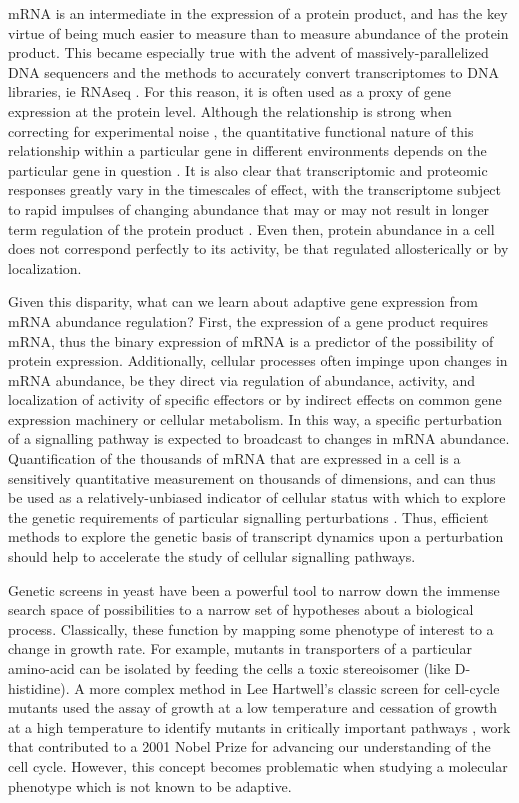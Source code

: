 mRNA is an intermediate in the expression of a protein product, and
has the key virtue of being much easier to measure than to measure
abundance of the protein product. This became especially true with the
advent of massively-parallelized DNA sequencers and the methods to
accurately convert transcriptomes to DNA libraries, ie RNAseq
\parencite{shendure2017dna}. For this reason, it is often used as a proxy
of gene expression at the protein level. Although the relationship is
strong when correcting for experimental noise 
\parencite{csardi2015accounting},
the quantitative functional nature of this relationship within a
particular gene in different environments depends on the particular
gene in question 
\parencite{franks2017post}. It is also clear that
transcriptomic and proteomic responses greatly vary in the timescales
of effect, with the transcriptome subject to rapid impulses of
changing abundance that may or may not result in longer term
regulation of the protein product 
\parencite{cheng2016differential,lee2011dynamic}. 
Even then, protein abundance in a cell does not correspond
perfectly to its activity, be that regulated allosterically or by
localization.  

Given this disparity, what can we learn about adaptive
gene expression from mRNA abundance regulation? First, the expression
of a gene product requires mRNA, thus the binary expression of mRNA is
a predictor of the possibility of protein expression. Additionally,
cellular processes often impinge upon changes in mRNA abundance, be
they direct via regulation of abundance, activity, and localization of
activity of specific effectors or by indirect effects on common gene
expression machinery or cellular metabolism. In this way, a specific
perturbation of a signalling pathway is expected to broadcast to
changes in mRNA abundance. Quantification of the thousands of mRNA
that are expressed in a cell is a sensitively quantitative measurement
on thousands of dimensions, and can thus be used as a
relatively-unbiased indicator of cellular status with which to explore
the genetic requirements of particular signalling perturbations 
\parencite{gapp2016parallel}. Thus, efficient methods to explore the genetic
basis of transcript dynamics upon a perturbation should help to
accelerate the study of cellular signalling pathways.  

Genetic screens
in yeast have been a powerful tool to narrow down the immense search
space of possibilities to a narrow set of hypotheses about a
biological process. Classically, these function by mapping some
phenotype of interest to a change in growth rate. For example, mutants
in transporters of a particular amino-acid can be isolated by feeding
the cells a toxic stereoisomer (like D-histidine). A more complex
method in Lee Hartwell’s classic screen for cell-cycle mutants used
the assay of growth at a low temperature and cessation of growth at a
high temperature to identify mutants in critically important pathways
\parencite{hartwell1970genetic}, work that contributed to a 2001 Nobel Prize for
advancing our understanding of the cell cycle. However, this concept
becomes problematic when studying a molecular phenotype which is not
known to be adaptive. 

